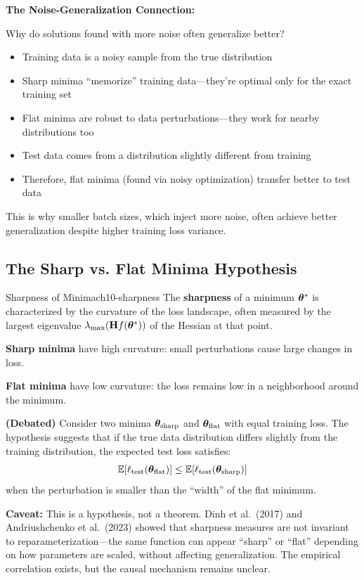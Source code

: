 \documentclass[../../main.tex]{subfiles}
\begin{document}
\begin{principle}
\textbf{The Noise-Generalization Connection:}

Why do solutions found with more noise often generalize better?
\begin{itemize}
    \item Training data is a noisy sample from the true distribution
    \item Sharp minima ``memorize'' training data---they're optimal only for the exact training set
    \item Flat minima are robust to data perturbations---they work for nearby distributions too
    \item Test data comes from a distribution slightly different from training
    \item Therefore, flat minima (found via noisy optimization) transfer better to test data
\end{itemize}
This is why smaller batch sizes, which inject more noise, often achieve better generalization despite higher training loss variance.
\end{principle}

\subsection{The Sharp vs. Flat Minima Hypothesis}

\begin{definition}{Sharpness of Minima}{ch10-sharpness}
The \textbf{sharpness} of a minimum $\boldsymbol{\theta}^*$ is characterized by the curvature of the loss landscape, often measured by the largest eigenvalue $\lambda_{\max}(\mathbf{H} f(\boldsymbol{\theta}^*))$ of the Hessian at that point.

\textbf{Sharp minima} have high curvature: small perturbations cause large changes in loss.

\textbf{Flat minima} have low curvature: the loss remains low in a neighborhood around the minimum.
\end{definition}

\begin{principle}[title=Flat Minima Hypothesis]
\textbf{(Debated)} Consider two minima $\boldsymbol{\theta}_{\text{sharp}}$ and $\boldsymbol{\theta}_{\text{flat}}$ with equal training loss. The hypothesis suggests that if the true data distribution differs slightly from the training distribution, the expected test loss satisfies:
\[
    \operatorname{\mathbb{E}}[\ell_{\text{test}}(\boldsymbol{\theta}_{\text{flat}})] \leq \operatorname{\mathbb{E}}[\ell_{\text{test}}(\boldsymbol{\theta}_{\text{sharp}})]
\]
when the perturbation is smaller than the ``width'' of the flat minimum.

\textbf{Caveat:} This is a hypothesis, not a theorem. Dinh et al.\ (2017) and Andriushchenko et al.\ (2023) showed that sharpness measures are not invariant to reparameterization---the same function can appear ``sharp'' or ``flat'' depending on how parameters are scaled, without affecting generalization. The empirical correlation exists, but the causal mechanism remains unclear.
\end{principle}
\end{document}
